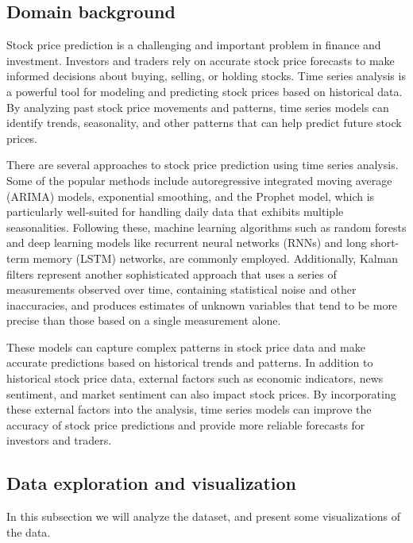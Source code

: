 \documentclass[12pt]{article}
\theoremstyle{definition}
\begin{document}
\subsection{Domain background}
Stock price prediction is a challenging and important problem in finance and investment. 
Investors and traders rely on accurate stock price forecasts to make informed decisions about buying, selling, or holding stocks. 
Time series analysis is a powerful tool for modeling and predicting stock prices based on historical data. 
By analyzing past stock price movements and patterns, time series models can identify trends, seasonality, and other patterns that can help predict future stock prices.

There are several approaches to stock price prediction using time series analysis. 
Some of the popular methods include autoregressive integrated moving average (ARIMA) models, exponential smoothing, and the Prophet model, which is particularly well-suited for handling daily data that exhibits multiple seasonalities. 
Following these, machine learning algorithms such as random forests and deep learning models like recurrent neural networks (RNNs) and long short-term memory (LSTM) networks, are commonly employed. 
Additionally, Kalman filters represent another sophisticated approach that uses a series of measurements observed over time, containing statistical noise and other inaccuracies, and produces estimates of unknown variables that tend to be more precise than those based on a single measurement alone.

These models can capture complex patterns in stock price data and make accurate predictions based on historical trends and patterns.
In addition to historical stock price data, external factors such as economic indicators, news sentiment, and market sentiment can also impact stock prices. By incorporating these external factors into the analysis, time series models can improve the accuracy of stock price predictions and provide more reliable forecasts for investors and traders.

\subsection{Data exploration and visualization}
In this subsection we will analyze the dataset, and present some visualizations of the data.
\end{document}
